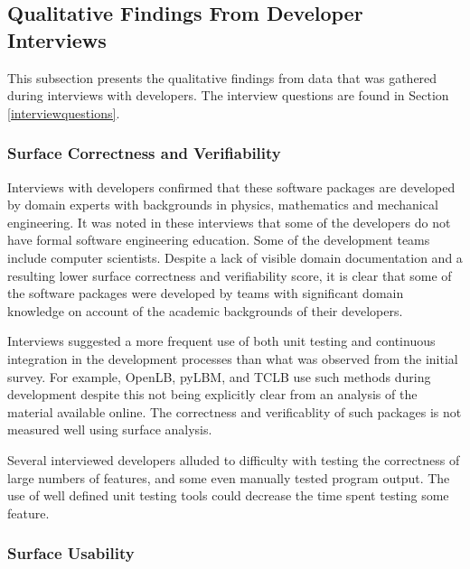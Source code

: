 \documentclass[12pt, notitlepage]{article}
\begin{document}
\subsection{Qualitative Findings From Developer Interviews}\label{interviewresults}

This subsection presents the qualitative findings from data that was gathered during interviews with developers. The interview questions are found in Section \ref{interviewquestions}.

\subsubsection{Surface Correctness and Verifiability}

Interviews with developers confirmed that these software packages are developed by domain experts with backgrounds in physics, mathematics and mechanical engineering. It was noted in these interviews that some of the developers do not have formal software engineering education. Some of the development teams include computer scientists. Despite a lack of visible domain documentation and a resulting lower surface correctness and verifiability score, it is clear that some of the software packages were developed by teams with significant domain knowledge on account of the academic backgrounds of their developers. 

Interviews suggested a more frequent use of both unit testing and continuous integration in the development processes than what was observed from the initial survey. For example, OpenLB, pyLBM, and TCLB use such methods during development despite this not being explicitly clear from an analysis of the material available online. The correctness and verificablity of such packages is not measured well using surface analysis.

Several interviewed developers alluded to difficulty with testing the correctness of large numbers of features, and some even manually tested program output. The use of well defined unit testing tools could decrease the time spent testing some feature.

\subsubsection{Surface Usability}
\end{document}
